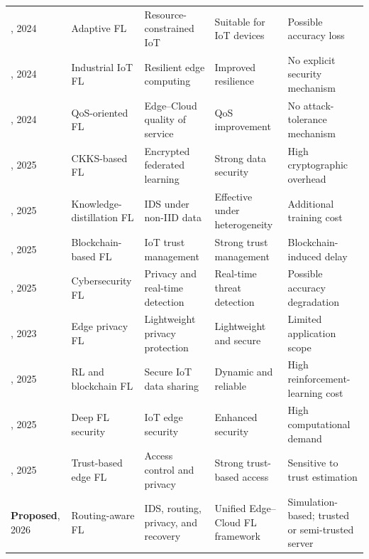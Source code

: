 \documentclass[5p,times,numafflabel]{elsarticle}
\begin{document}
\begin{table}[!t]
\begin{tabularx}{\textwidth}{@{}l p{2.6cm} Y Y Y@{}}
			\cite{mughal2024adaptive}, 2024
			& Adaptive FL
			& Resource-constrained IoT
			& Suitable for IoT devices
			& Possible accuracy loss \\
			
			\cite{liu2024iiot}, 2024
			& Industrial IoT FL
			& Resilient edge computing
			& Improved resilience
			& No explicit security mechanism \\
			
			\cite{zhou2024qos}, 2024
			& QoS-oriented FL
			& Edge--Cloud quality of service
			& QoS improvement
			& No attack-tolerance mechanism \\
			
			\cite{lan2025ckks}, 2025
			& CKKS-based FL
			& Encrypted federated learning
			& Strong data security
			& High cryptographic overhead \\
			
			\cite{peng2025fdids}, 2025
			& Knowledge-distillation FL
			& IDS under non-IID data
			& Effective under heterogeneity
			& Additional training cost \\
			
			\cite{wang2024trust}, 2025
			& Blockchain-based FL
			& IoT trust management
			& Strong trust management
			& Blockchain-induced delay \\
			
			\cite{rahmati2025cybersecurity}, 2025
			& Cybersecurity FL
			& Privacy and real-time detection
			& Real-time threat detection
			& Possible accuracy degradation \\
			
			\cite{li2023privacy}, 2023
			& Edge privacy FL
			& Lightweight privacy protection
			& Lightweight and secure
			& Limited application scope \\
			
			\cite{bayat2025qlearning}, 2025
			& RL and blockchain FL
			& Secure IoT data sharing
			& Dynamic and reliable
			& High reinforcement-learning cost \\
			
			\cite{albogami2025deepfl}, 2025
			& Deep FL security
			& IoT edge security
			& Enhanced security
			& High computational demand \\
			
			\cite{padmavathi2025trust}, 2025
			& Trust-based edge FL
			& Access control and privacy
			& Strong trust-based access
			& Sensitive to trust estimation \\
			
			\textbf{Proposed}, 2026
			& Routing-aware FL
			& IDS, routing, privacy, and recovery
			& Unified Edge--Cloud FL framework
			& Simulation-based; trusted or semi-trusted server \\
			
			\bottomrule
		\end{tabularx}
	\end{table}
	\FloatBarrier
\end{document}
